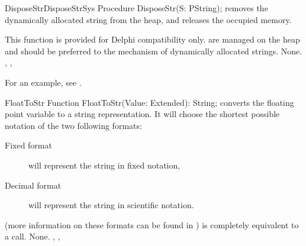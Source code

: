 



\begin{procedurel}{DisposeStr}{DisposeStrSys}
\Declaration
Procedure DisposeStr(S: PString);
\Description
{} removes the dynamically allocated string  from the
heap, and releases the occupied memory.

This function is provided for Delphi compatibility only. 
are managed on the heap and should be preferred to the mechanism of
dynamically allocated strings.
\Errors
None.
\SeeAlso
{}, , 
\end{procedurel}

For an example, see .

\begin{function}{FloatToStr}
\Declaration
Function FloatToStr(Value: Extended): String;
\Description
{} converts the floating point variable  to a
string representation.  It will choose the shortest possible notation of the
two following formats:
\begin{description}
\item[Fixed format] will represent the string in fixed notation,
\item[Decimal format] will represent the string in scientific notation.
\end{description}
(more information on these formats can be found in )
 is completely equivalent to a  call.
\Errors
None.
\SeeAlso
{}, , 
\end{function}



